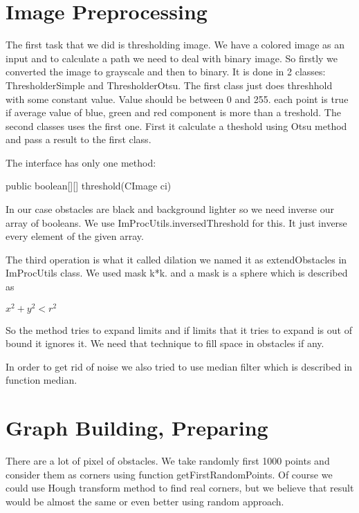 \documentclass[12pt]{article}
\begin{document}
\maketitle

\begin{abstract}

\end{abstract}

\section{Image Preprocessing}

The first task that we did is thresholding image. We have a colored image as an input and to calculate a path we need to deal with binary image. So firstly we converted the image to grayscale and then to binary. It is done in 2 classes: ThresholderSimple and ThresholderOtsu. The first class just does threshhold with some constant value. Value should be between 0 and 255. each point is true if average value of blue, green and red component is more than a treshold. The second classes uses the first one. First it calculate a theshold using Otsu method and pass a result to the first class.

The interface has only one method:

    public boolean[][] threshold(CImage ci)

In our case obstacles are black and background lighter so we need inverse our array of booleans. We use ImProcUtils.inversedThreshold for this. It just inverse every element of the given array.

The third operation is what it called dilation we named it as extendObstacles in ImProcUtils class. We used mask k*k. and a mask is a sphere which is described as

$x^2 + y^2 < r^2$

So the method tries to expand limits and if limits that it tries to expand is out of bound it ignores it. We need that technique to fill space in obstacles if any.

In order to get rid of noise we also tried to use median filter which is described in function median.

\section{Graph Building, Preparing}

There are a lot of pixel of obstacles. We take randomly first 1000 points and consider them as corners using function getFirstRandomPoints. Of course we could use Hough transform method to find real corners, but we believe that result would be almost the same or even better using random approach.
\end{document}
